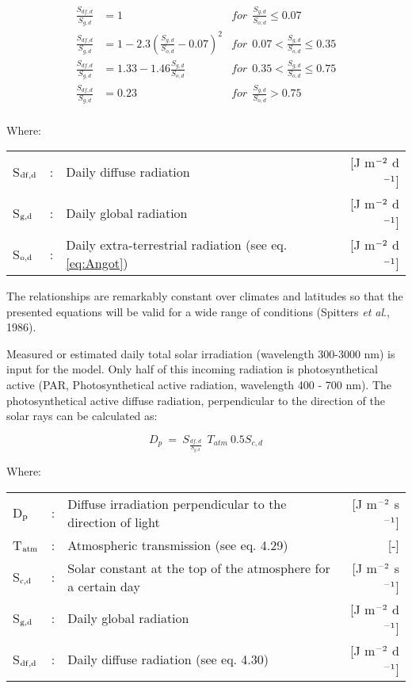 \begin{align}
{\frac{S _{df,d} }{S _{g, d} }} &= 1 & 
      for ~~ {\frac{S _{g,d} }{S _{o,d} }} \le 0.07 \nonumber \\
{\frac{S _{df,d} }{S _{g,d} }} &= 1-2.3({\frac{S _{g,d} }{S _{o,d} }} -0.07) ^{2} & 
      for ~~ 0.07 < {\frac{S _{g,d} }{S _{o,d} }} \le 0.35  \nonumber \\
{\frac{S _{df,d} }{S _{g,d} }} &= 1.33-1.46{\frac{S _{g,d} }{S _{o,d} }} &
      for ~~ 0.35 < {\frac{S _{g,d} }{S _{o,d} }} \le 0.75 \nonumber \\
{\frac{S _{df,d} }{S _{g,d} }} &= 0.23 &
      for ~~ {\frac{S _{g,d} }{S _{o,d} }} > 0.75 \nonumber \\
\end{align}

Where:\\
\begin{tabularx}{\textwidth}{llXr}
S$_{{\rm df,d}}$ &:& Daily diffuse radiation  & [J m$^{{\rm -2}}$ d$^{{\rm -1}}$]\\
S$_{{\rm g,d}}$ &:& Daily global radiation  & [J m$^{{\rm -2}}$ d$^{{\rm -1}}$]\\
S$_{{\rm o,d}}$ &:& Daily extra-terrestrial radiation (see eq. \ref{eq:Angot})  & [J m$^{{\rm -2}}$ d$^{{\rm -1}}$]\\
\end{tabularx}

The relationships are remarkably constant over climates and latitudes so that the presented
equations will be valid for a wide range of conditions (Spitters {\it et al\/}., 1986).

Measured or estimated daily total solar irradiation (wavelength 300-3000 nm) is input for
the model. Only half of this incoming radiation is photosynthetical active (PAR,
{\nobreak}Photosynthetical active radiation, wavelength 400 - 700 nm). The photosynthetical active
diffuse radiation, perpendicular to the direction of the solar rays can be calculated as:

\begin{equation}
D _{p} ~=~ S _{\frac{df,d}{S _{g,d} }} ~~ T _{atm} ~0.5S _{c,d} 
\end{equation}

 
Where:\\
\begin{tabularx}{\textwidth}{llXr}
D$_{{\rm p}}$ &:& Diffuse irradiation perpendicular to the direction of light  & [J m$^{{\rm -2}}$ s$^{{\rm -1}}$]\\
T$_{{\rm atm}}$ &:& Atmospheric transmission (see eq. 4.29)  & [-]\\
S$_{{\rm c,d}}$ &:& Solar constant at the top of the atmosphere for a certain day  & [J m$^{{\rm -2}}$ s$^{{\rm -1}}$]\\
S$_{{\rm g,d}}$ &:& Daily global radiation  & [J m$^{{\rm -2}}$ d$^{{\rm -1}}$]\\
S$_{{\rm df,d}}$ &:& Daily diffuse radiation (see eq. 4.30)  & [J m$^{{\rm -2}}$ d$^{{\rm -1}}$]\\
\end{tabularx}

